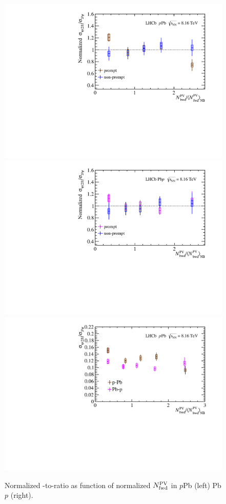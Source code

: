 \begin{figure}[H]
\begin{center}
\includegraphics[width=0.49\linewidth]{pdf/pPb/BWorkdir/Result/All.pdf}
\includegraphics[width=0.49\linewidth]{pdf/Pbp/BWorkdir/Result/All.pdf}
\includegraphics[width=0.7\linewidth]{pdf/pPb/BWorkdir/Result/Norm.pdf}
\end{center}
\caption{Normalized \psitwos-to-\jpsi ratio as function of normalized $N_{\rm fwd}^{\rm PV}$ in $p$Pb (left) Pb$p$ (right).}
\label{NormBack}
\end{figure}

